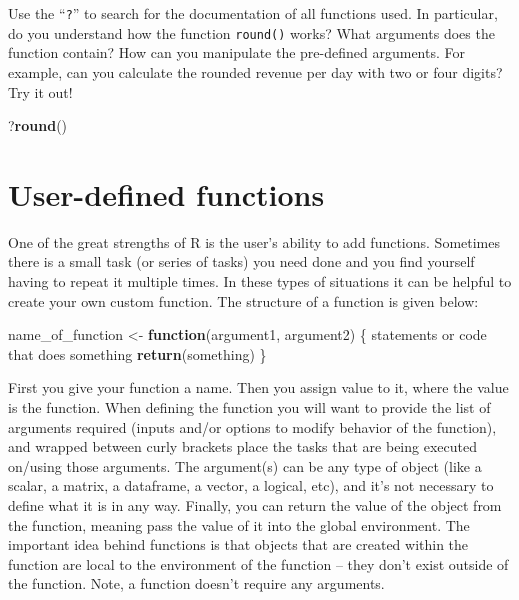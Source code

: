 \documentclass[
  12pt,
  oneside]{book}
\newenvironment{Shaded}{\begin{snugshade}}{\end{snugshade}}
\newcommand{\ControlFlowTok}[1]{\textcolor[rgb]{0.13,0.29,0.53}{\textbf{#1}}}
\newcommand{\FunctionTok}[1]{\textcolor[rgb]{0.13,0.29,0.53}{\textbf{#1}}}
\newcommand{\NormalTok}[1]{#1}
\newcommand{\OtherTok}[1]{\textcolor[rgb]{0.56,0.35,0.01}{#1}}
\begin{document}
Use the ``\texttt{?}'' to search for the documentation of all functions used. In particular, do you understand how the function \texttt{round()} works? What arguments does the function contain? How can you manipulate the pre-defined arguments. For example, can you calculate the rounded revenue per day with two or four digits? Try it out!

\begin{Shaded}
\begin{Highlighting}[]
\NormalTok{?}\FunctionTok{round}\NormalTok{()}
\end{Highlighting}
\end{Shaded}

\hypertarget{sec:generics}{%
\section{User-defined functions}\label{sec:generics}}

One of the great strengths of R is the user's ability to add functions. Sometimes there is a small task (or series of tasks) you need done and you find yourself having to repeat it multiple times. In these types of situations it can be helpful to create your own custom function. The structure of a function is given below:

\begin{Shaded}
\begin{Highlighting}[]
\NormalTok{name\_of\_function }\OtherTok{\textless{}{-}} \ControlFlowTok{function}\NormalTok{(argument1, argument2) \{}
\NormalTok{    statements or code that does something}
    \FunctionTok{return}\NormalTok{(something)}
\NormalTok{\}}
\end{Highlighting}
\end{Shaded}

First you give your function a name.
Then you assign value to it, where the value is the function.
When defining the function you will want to provide the list of arguments required (inputs and/or options to modify behavior of the function), and wrapped between curly brackets place the tasks that are being executed on/using those arguments. The argument(s) can be any type of object (like a scalar, a matrix, a dataframe, a vector, a logical, etc), and it's not necessary to define what it is in any way.
Finally, you can return the value of the object from the function, meaning pass the value of it into the global environment. The important idea behind functions is that objects that are created within the function are local to the environment of the function -- they don't exist outside of the function. Note, a function doesn't require any arguments.
\end{document}
